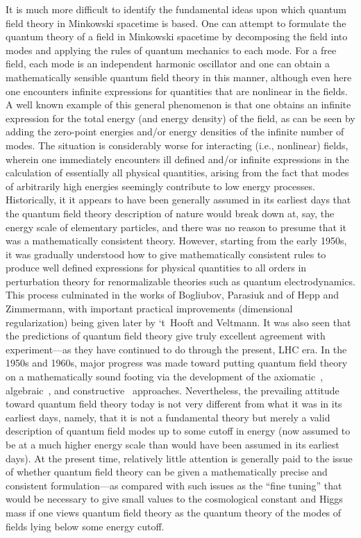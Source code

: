 \documentclass[12pt]{article}
\theoremstyle{plain}
\theoremstyle{definition}
\begin{document}
It is much more difficult to identify the fundamental ideas upon which quantum field theory in Minkowski spacetime is based. One can attempt to formulate the quantum theory of a field in Minkowski spacetime by decomposing the field into modes and applying the rules of quantum mechanics to each mode. For a free field, each mode is an independent harmonic oscillator and one can obtain a mathematically sensible quantum field theory in this manner, although even here one encounters infinite expressions for quantities that are nonlinear in the fields. A well known example of this general phenomenon is that one obtains an infinite expression for the total energy (and energy density) of the field, as can be seen by adding the zero-point energies and/or energy densities of the infinite number of modes. The situation is considerably worse for interacting (i.e., nonlinear) fields, wherein one immediately encounters ill defined and/or infinite expressions in the calculation of essentially all physical quantities, arising from the fact that modes of arbitrarily high energies seemingly contribute to low energy processes. Historically, it it appears to have been generally assumed in its earliest days that the quantum field theory description of nature would break down at, say, the energy scale of elementary particles, and there was no reason to presume that it was a mathematically consistent theory. However, starting from the early 1950s, it was gradually understood how to give mathematically consistent rules to produce well defined expressions for physical quantities to all orders in perturbation theory for renormalizable theories such as quantum electrodynamics. This process culminated in the works of Bogliubov, Parasiuk
and of Hepp and Zimmermann, with important practical improvements (dimensional regularization) being given later by `t~Hooft and Veltmann. It was also seen that the predictions of quantum field theory give truly excellent agreement with experiment---as they have continued to do through the present, LHC era. In the 1950s and 1960s, major progress was made toward putting quantum field theory on a mathematically sound footing via the development of the axiomatic~\cite{sw}, algebraic~\cite{haag}, and constructive~\cite{glimm} approaches. Nevertheless, the prevailing attitude toward quantum field theory today is not very different from what it was in its earliest days, namely, that it is not a fundamental theory but merely a valid description of quantum field modes up to some cutoff in energy (now assumed to be at a much higher energy scale than would have been assumed in its earliest days). At the present time, relatively little attention is generally paid to the issue of whether quantum field theory can be given a mathematically precise and consistent formulation---as compared with such issues as the ``fine tuning'' that would be necessary to give small values to the cosmological constant and Higgs mass if one views quantum field theory as the quantum theory of the modes of fields lying below some energy cutoff.
\end{document}
